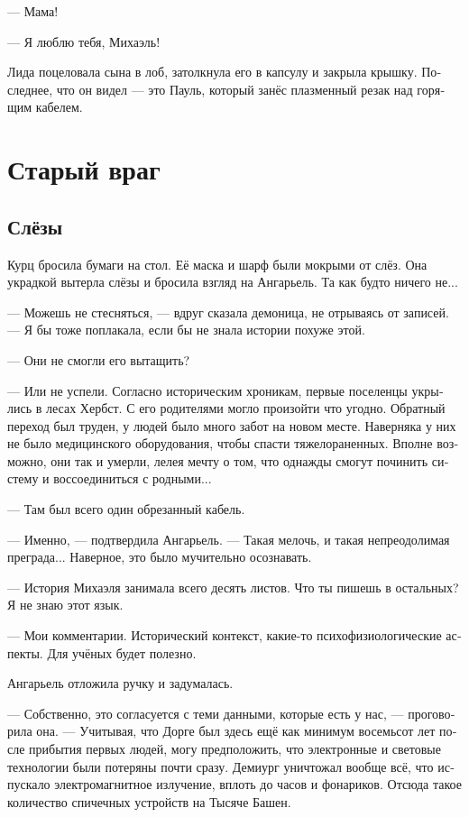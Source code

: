 \documentclass[a4paper,12pt,fleqn]{book}\usepackage{cooltooltips}\usepackage{polyglossia}\setdefaultlanguage[babelshorthands=true]{russian}\setotherlanguage{english}\defaultfontfeatures{Ligatures=TeX,Mapping=tex-text} \usepackage{xcolor}\definecolor{lightgray}{HTML}{bbbbbb}\color{lightgray}\newcommand{\ml}[3]{\textenglish{\textcolor{black}{#3}}}
\begin{document}
--- Мама!

--- Я люблю тебя, Михаэль!

Лида поцеловала сына в лоб, затолкнула его в капсулу и закрыла крышку.
Последнее, что он видел --- это Пауль, который занёс плазменный резак над горящим кабелем.

\chapter{Старый враг}

\section{Слёзы}

Курц бросила бумаги на стол.
Её маска и шарф были мокрыми от слёз.
Она украдкой вытерла слёзы и бросила взгляд на Ангарьель.
Та как будто ничего не...

--- Можешь не стесняться, --- вдруг сказала демоница, не отрываясь от записей.
--- Я бы тоже поплакала, если бы не знала истории похуже этой.

--- Они не смогли его вытащить?

--- Или не успели.
Согласно историческим хроникам, первые поселенцы укрылись в лесах Хербст.
С его родителями могло произойти что угодно.
Обратный переход был труден, у людей было много забот на новом месте.
Наверняка у них не было медицинского оборудования, чтобы спасти тяжелораненных.
Вполне возможно, они так и умерли, лелея мечту о том, что однажды смогут починить систему и воссоединиться с родными...

--- Там был всего один обрезанный кабель.

--- Именно, --- подтвердила Ангарьель.
--- Такая мелочь, и такая непреодолимая преграда...
Наверное, это было мучительно осознавать.

--- История Михаэля занимала всего десять листов.
Что ты пишешь в остальных?
Я не знаю этот язык.

--- Мои комментарии.
Исторический контекст, какие-то психофизиологические аспекты.
Для учёных будет полезно.

Ангарьель отложила ручку и задумалась.

--- Собственно, это согласуется с теми данными, которые есть у нас, --- проговорила она.
--- Учитывая, что Дорге был здесь ещё как минимум восемьсот лет после прибытия первых людей, могу предположить, что электронные и световые технологии были потеряны почти сразу.
Демиург уничтожал вообще всё, что испускало электромагнитное излучение, вплоть до часов и фонариков.
Отсюда такое количество спичечных устройств на Тысяче Башен.
\end{document}

